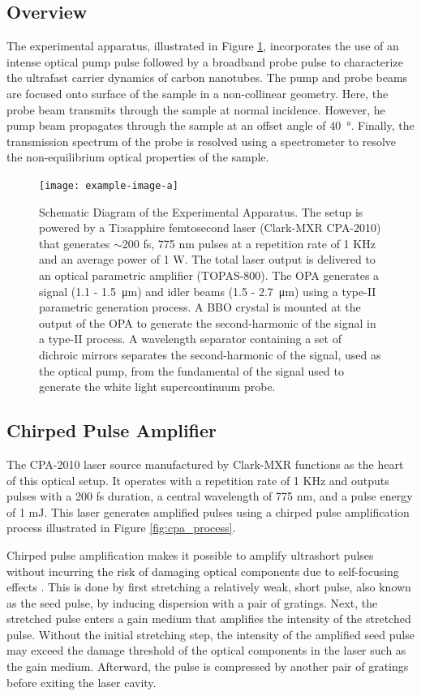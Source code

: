 \subsection{Overview}
The experimental apparatus, illustrated in Figure \ref{fig:setup_schematic}, incorporates the use of an intense optical pump pulse followed by a broadband probe pulse to characterize the ultrafast carrier dynamics of carbon nanotubes. The pump and probe beams are focused onto surface of the sample in a non-collinear geometry. Here, the probe beam transmits through the sample at normal incidence. However, he pump beam propagates through the sample at an offset angle of \SI{40}{\degree}. Finally, the transmission spectrum of the probe is resolved using a spectrometer to resolve the non-equilibrium optical properties of the sample.


\begin{figure}[ht]
	\centering
	\texttt{[image: example-image-a]}
	\caption{Schematic Diagram of the Experimental Apparatus. The setup is powered by a Ti:sapphire femtosecond laser (Clark-MXR CPA-2010) that generates $\sim$200 fs, 775 nm pulses at a repetition rate of 1 KHz and an average power of 1 W. The total laser output is delivered to an optical parametric amplifier (TOPAS-800). The OPA generates a signal (1.1 - \SI{1.5}{\micro\meter}) and idler beams (1.5 - \SI{2.7}{\micro\meter}) using a type-II parametric generation process.  A BBO crystal is mounted at the output of the OPA to generate the second-harmonic of the signal in a type-II process. A wavelength separator containing a set of dichroic mirrors separates the second-harmonic of the signal, used as the optical pump, from the fundamental of the signal used to generate the white light supercontinuum probe.}
	\label{fig:setup_schematic}
\end{figure}


\subsection{Chirped Pulse Amplifier}
The CPA-2010 laser source manufactured by Clark-MXR functions as the heart of this optical setup. It operates with a repetition rate of 1 KHz and outputs pulses with a 200 fs duration, a central wavelength of 775 nm, and a pulse energy of 1 mJ. This laser generates amplified pulses using a chirped pulse amplification process illustrated in Figure \ref{fig:cpa_process}.

Chirped pulse amplification makes it possible to amplify ultrashort pulses without incurring the risk of damaging optical components due to self-focusing effects \cite{strickland1985compression}. This is done by first stretching a relatively weak, short pulse, also known as the seed pulse, by inducing dispersion with a pair of gratings. Next, the stretched pulse enters a gain medium that amplifies the intensity of the stretched pulse. Without the initial stretching step, the intensity of the amplified seed pulse may exceed the damage threshold of the optical components in the laser such as the gain medium. Afterward, the pulse is compressed by another pair of gratings before exiting the laser cavity.


